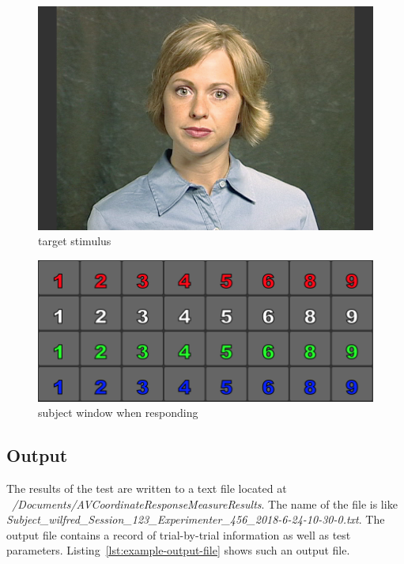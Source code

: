 \documentclass[11pt,pdftex,letterpaper]{article}
\begin{document}
\begin{figure}
\centering
\includegraphics[width = 0.9\linewidth]{target-stimulus.png}
\caption{target stimulus}
\label{fig:target-stimulus}
\end{figure}

\begin{figure}
\centering
\includegraphics[width = 0.9\linewidth]{subject-response-window.png}
\caption{subject window when responding}
\label{fig:subject-response-window}
\end{figure}

\subsection{Output}
The results of the test are written to a text file located at \textit{\string~/Documents/AVCoordinateResponseMeasureResults}. The name of the file is like \textit{Subject\_wilfred\_Session\_123\_Experimenter\_456\_2018-6-24-10-30-0.txt}. The output file contains a record of trial-by-trial information as well as test parameters. Listing~\ref{lst:example-output-file} shows such an output file.

\noindent\begin{minipage}{\textwidth}

\end{minipage}
\end{document}
